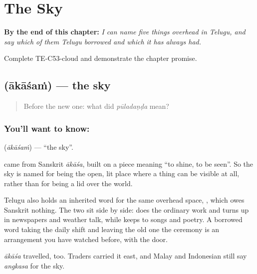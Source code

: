
\chapter{The Sky}
\label{ch:te-sky}

\begin{chapteropening}
\textbf{By the end of this chapter:} \emph{I can name five things overhead in Telugu, and say which of them Telugu borrowed and which it has always had.}

Complete TE-C53-cloud and demonstrate the chapter promise.
\end{chapteropening}

\section[\texorpdfstring{\te{ఆకాశం} (ākāśaṁ)}{ఆకాశం (ākāśaṁ)}]{ (ākāśaṁ) — the sky}

\label{lesson:TE-C53-sky}



\begin{quote}
Before the new one: what did \emph{pūladaṇḍa} mean?
\end{quote}

\subsection*{You'll want to know: }
\textbf{} (\emph{ākāśaṁ}) — \textquotedblleft{}the sky\textquotedblright{}.

 came from Sanskrit \emph{ākāśa}, built on a piece meaning \textquotedblleft{}to shine, to be seen\textquotedblright{}. So the sky is named for being the open, lit place where a thing can be visible at all, rather than for being a lid over the world.

Telugu also holds an inherited word for the same overhead space, , which owes Sanskrit nothing. The two sit side by side:  does the ordinary work and turns up in newspapers and weather talk, while  keeps to songs and poetry. A borrowed word taking the daily shift and leaving the old one the ceremony is an arrangement you have watched before, with the door.

\emph{ākāśa} travelled, too. Traders carried it east, and Malay and Indonesian still say \emph{angkasa} for the sky.

